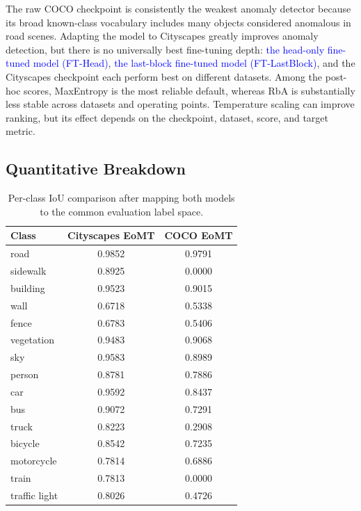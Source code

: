 \documentclass[10pt,twocolumn,letterpaper]{article}
\begin{document}
The raw COCO checkpoint is consistently the weakest anomaly detector because its broad known-class vocabulary includes many objects considered anomalous in road scenes. Adapting the model to Cityscapes greatly improves anomaly detection, but there is no universally best fine-tuning depth: \textcolor{blue}{the head-only fine-tuned model (FT-Head)}, \textcolor{blue}{the last-block fine-tuned model (FT-LastBlock)}, and the Cityscapes checkpoint each perform best on different datasets. Among the post-hoc scores, MaxEntropy is the most reliable default, whereas RbA is substantially less stable across datasets and operating points. Temperature scaling can improve ranking, but its effect depends on the checkpoint, dataset, score, and target metric.

\subsection{Quantitative Breakdown}

\begin{table}[t]
    \centering
    \caption{Per-class IoU comparison after mapping both models to the common evaluation label space.}
    \label{tab:step4_per_class}
    \begin{tabular}{lcc}
        \hline
        Class & Cityscapes EoMT & COCO EoMT \\
        \hline
        road & 0.9852 & 0.9791 \\
        sidewalk & 0.8925 & 0.0000 \\
        building & 0.9523 & 0.9015 \\
        wall & 0.6718 & 0.5338 \\
        fence & 0.6783 & 0.5406 \\
        vegetation & 0.9483 & 0.9068 \\
        sky & 0.9583 & 0.8989 \\
        person & 0.8781 & 0.7886 \\
        car & 0.9592 & 0.8437 \\
        bus & 0.9072 & 0.7291 \\
        truck & 0.8223 & 0.2908 \\
        bicycle & 0.8542 & 0.7235 \\
        motorcycle & 0.7814 & 0.6886 \\
        train & 0.7813 & 0.0000 \\
        traffic light & 0.8026 & 0.4726 \\
        \hline
    \end{tabular}
\end{table}
\end{document}
